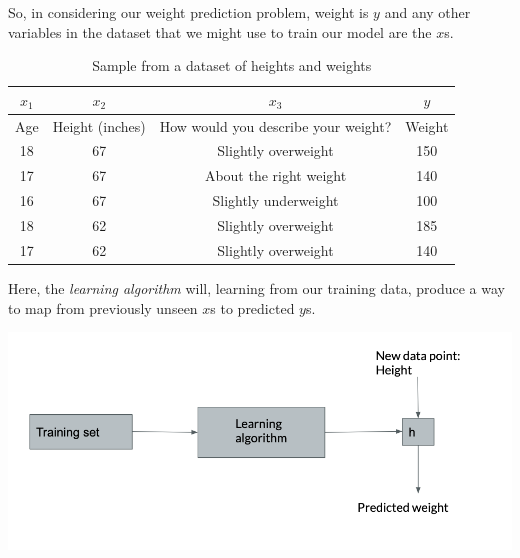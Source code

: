 \documentclass[12pt]{article}
\begin{document}
So, in considering our weight prediction problem, weight is $y$ and any other variables in the dataset that we might use to train our model are the $x$s. 

\begin{table}[htp]
\caption{Sample from a dataset of heights and weights}
\begin{center}
\begin{tabular}{|c|c|c|c|}
\hline
$x_1$ & $x_2$ & $x_3$ & $y$ \\ \hline
Age & Height (inches) & How would you describe your weight? & Weight \\ \hline
18 & 67 & Slightly overweight & 150 \\
17 & 67 & About the right weight & 140 \\
16 & 67 & Slightly underweight & 100 \\
18 & 62 & Slightly overweight & 185 \\
17 & 62 & Slightly overweight  & 140 \\
\hline
\end{tabular}
\end{center}
\label{table:height-weight-sample-table-xs}
\end{table}%

Here, the \textit{learning algorithm} will, learning from our training data, produce a way to map from previously unseen $x$s to predicted $y$s.


\includegraphics[width={\textwidth}]{the-model}
\end{document}

